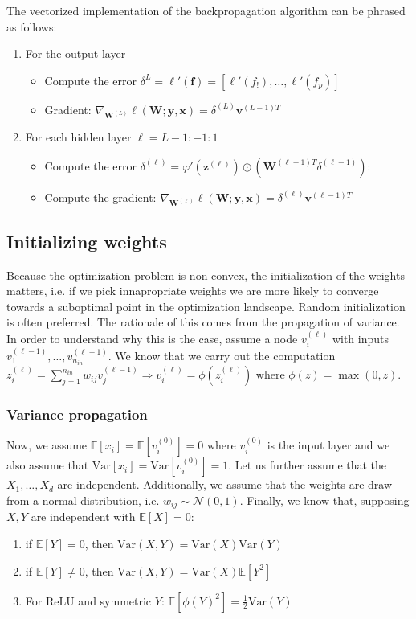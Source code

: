 \documentclass[a4paper,10pt,twoside]{article}
\begin{document}
The vectorized implementation of the backpropagation algorithm can be phrased as follows:
\begin{enumerate}
    \item For the output layer
    \begin{itemize}
        \item Compute the error $\delta^{L}=\mathbf{\ell'(f)}=[\ell'(f_!),\dots, \ell'(f_p)]$
        \item Gradient: $\nabla_{\mathbf{W}^{(L)}}\ell(\mathbf{W};\mathbf{y},\mathbf{x})=\delta^{(L)}\mathbf{v}^{(L-1)T}$
    \end{itemize}
    \item For each hidden layer $\ell=L-1:-1:1$
    \begin{itemize}
        \item Compute the error $\delta^{(\ell)}=\varphi'(\mathbf{z}^{(\ell)})\odot(\mathbf{W}^{(\ell +1) T}\delta^{(\ell+1)})$: 
        \item Compute the gradient: $\nabla_{\mathbf{W}^{(\ell)}}\ell(\mathbf{W};\mathbf{y},\mathbf{x})=\delta^{(\ell)}\mathbf{v}^{(\ell-1)T}$
    \end{itemize}
\end{enumerate}

\subsection{Initializing weights}

Because the optimization problem is non-convex, the initialization of the weights matters, i.e. if we pick innapropriate weights we are more likely to converge towards a suboptimal point in the optimization landscape. Random initialization is often preferred. The rationale of this comes from the propagation of variance. In order to understand why this is the case, assume a node $v_i^{(\ell)}$ with inputs $v_1^{(\ell -1)},\ldots,v_{n_{in}}^{(\ell -1)}$. We know that we carry out the computation $z_i^{(\ell)}=\sum_{j=1}^{n_{in}}w_{ij}v_j^{(\ell-1)}\Rightarrow v_i^{(\ell)}=\phi(z_i^{(\ell)})$ where $\phi(z)=\max(0,z)$. 

\subsubsection{Variance propagation}

Now, we assume $\mathbb{E}[x_i]=\mathbb{E}[v_i^{(0)}]=0$ where $v_i^{(0)}$ is the input layer and we also assume that $\text{Var}[x_i]=\text{Var}[v_i^{(0)}]=1$. Let us further assume that the $X_1, \ldots, X_d$ are independent. Additionally, we assume that the weights are draw from a normal distribution, i.e. $w_{ij}\sim\mathcal{N}(0,1)$. Finally, we know that, supposing $X,Y$ are independent with $\mathbb{E}[X]=0$:
\begin{enumerate}[a]
    \item if $\mathbb{E}[Y]=0$, then $\text{Var}(X,Y)=\text{Var}(X)\text{Var}(Y)$
    \item if $\mathbb{E}[Y]\neq 0$, then $\text{Var}(X,Y)=\text{Var}(X)\mathbb{E}[Y^2]$
    \item For ReLU and symmetric $Y$: $\mathbb{E}[\phi(Y)^2]=\frac{1}{2}\text{Var}(Y)$
\end{enumerate}
\end{document}
